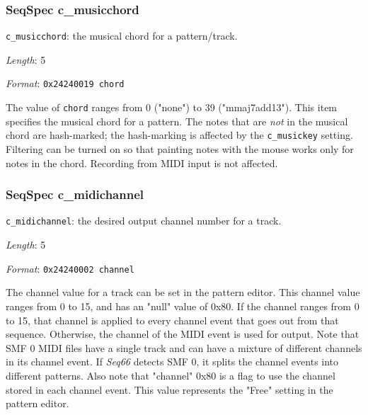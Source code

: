 \subsubsection{SeqSpec c\_musicchord}
\label{subsubsec:midi_format_track_seqspec_musicchord}

   \begin{description}
      \item \texttt{c\_musicchord}: the musical chord for a pattern/track.
      \item \textsl{Length}: 5
      \item \textsl{Format}: \texttt{0x24240019 chord}
   \end{description}

   The value of \texttt{chord} ranges from 0 ("none") to
   39 ("mmaj7add13").
   This item specifies the musical chord for a pattern.
   The notes that are \textsl{not} in the musical chord are
   hash-marked;
   the hash-marking is affected by the \texttt{c\_musickey} setting.
   Filtering can be turned on so that painting notes with
   the mouse works only for notes in the chord.
   Recording from MIDI input is not affected.

\subsubsection{SeqSpec c\_midichannel}
\label{subsubsec:midi_format_track_seqspec_midichannel}


   \begin{description}
      \item \texttt{c\_midichannel}:
         the desired output channel number for a track.
      \item \textsl{Length}: 5
      \item \textsl{Format}: \texttt{0x24240002 channel}
   \end{description}

   The channel value for a track can be set in the pattern editor.
   This channel value ranges from 0 to 15, and has an "null" value of 0x80.  If
   the channel ranges from 0 to 15, that channel is applied to every channel
   event that goes out from that sequence.  Otherwise, the channel of the MIDI
   event is used for output.  Note that SMF 0 MIDI files have a single track
   and can have a mixture of different channels in its channel event.
   If \textsl{Seq66} detects SMF 0, it splits the channel events into different
   patterns.
   Also note that "channel" 0x80 is a flag
   to use the channel stored in each channel event.
   This value represents the "Free" setting in the pattern editor.

